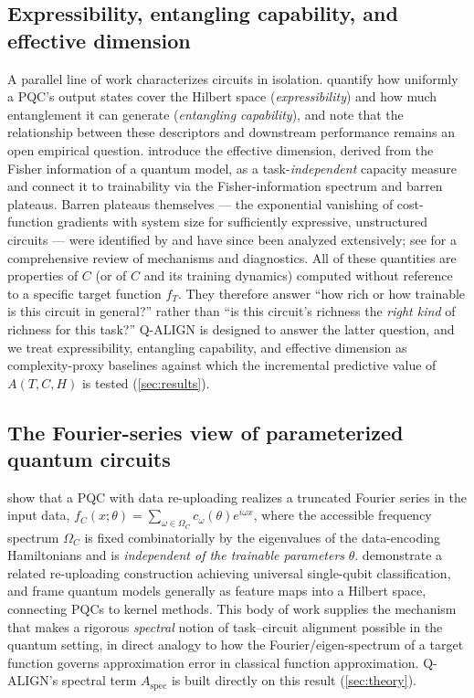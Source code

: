 \documentclass[11pt]{article}
\newcommand{\Aspec}{A_{\mathrm{spec}}}
\begin{document}
\subsection{Expressibility, entangling capability, and effective dimension}
A parallel line of work characterizes circuits in isolation. \citet{sim2019expressibility} quantify how uniformly a PQC's output states cover the Hilbert space (\emph{expressibility}) and how much entanglement it can generate (\emph{entangling capability}), and note that the relationship between these descriptors and downstream performance remains an open empirical question. \citet{abbas2021power} introduce the effective dimension, derived from the Fisher information of a quantum model, as a task-\emph{independent} capacity measure and connect it to trainability via the Fisher-information spectrum and barren plateaus. Barren plateaus themselves --- the exponential vanishing of cost-function gradients with system size for sufficiently expressive, unstructured circuits --- were identified by \citet{mcclean2018barren} and have since been analyzed extensively; see \citet{larocca2024review} for a comprehensive review of mechanisms and diagnostics. All of these quantities are properties of $C$ (or of $C$ and its training dynamics) computed without reference to a specific target function $f_T$. They therefore answer ``how rich or how trainable is this circuit in general?'' rather than ``is this circuit's richness the \emph{right kind} of richness for this task?'' Q-ALIGN is designed to answer the latter question, and we treat expressibility, entangling capability, and effective dimension as complexity-proxy baselines against which the incremental predictive value of $A(T,C,H)$ is tested (\cref{sec:results}).

\subsection{The Fourier-series view of parameterized quantum circuits}
\citet{schuld2021effect} show that a PQC with data re-uploading realizes a truncated Fourier series in the input data, $f_C(x;\theta) = \sum_{\omega \in \Omega_C} c_\omega(\theta) e^{i\omega x}$, where the accessible frequency spectrum $\Omega_C$ is fixed combinatorially by the eigenvalues of the data-encoding Hamiltonians and is \emph{independent of the trainable parameters} $\theta$. \citet{perezsalinas2020data} demonstrate a related re-uploading construction achieving universal single-qubit classification, and \citet{schuld2019quantum} frame quantum models generally as feature maps into a Hilbert space, connecting PQCs to kernel methods. This body of work supplies the mechanism that makes a rigorous \emph{spectral} notion of task--circuit alignment possible in the quantum setting, in direct analogy to how the Fourier/eigen-spectrum of a target function governs approximation error in classical function approximation. Q-ALIGN's spectral term $\Aspec$ is built directly on this result (\cref{sec:theory}).
\end{document}
